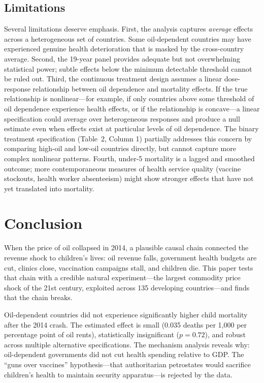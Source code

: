 \documentclass[12pt]{article}
\begin{document}
\subsection{Limitations}

Several limitations deserve emphasis. First, the analysis captures \textit{average} effects across a heterogeneous set of countries. Some oil-dependent countries may have experienced genuine health deterioration that is masked by the cross-country average. Second, the 19-year panel provides adequate but not overwhelming statistical power; subtle effects below the minimum detectable threshold cannot be ruled out. Third, the continuous treatment design assumes a linear dose-response relationship between oil dependence and mortality effects. If the true relationship is nonlinear---for example, if only countries above some threshold of oil dependence experience health effects, or if the relationship is concave---a linear specification could average over heterogeneous responses and produce a null estimate even when effects exist at particular levels of oil dependence. The binary treatment specification (Table~2, Column 1) partially addresses this concern by comparing high-oil and low-oil countries directly, but cannot capture more complex nonlinear patterns. Fourth, under-5 mortality is a lagged and smoothed outcome; more contemporaneous measures of health service quality (vaccine stockouts, health worker absenteeism) might show stronger effects that have not yet translated into mortality.


\section{Conclusion}
\label{sec:conclusion}

When the price of oil collapsed in 2014, a plausible causal chain connected the revenue shock to children's lives: oil revenue falls, government health budgets are cut, clinics close, vaccination campaigns stall, and children die. This paper tests that chain with a credible natural experiment---the largest commodity price shock of the 21st century, exploited across 135 developing countries---and finds that the chain breaks.

Oil-dependent countries did not experience significantly higher child mortality after the 2014 crash. The estimated effect is small (0.035 deaths per 1,000 per percentage point of oil rents), statistically insignificant ($p = 0.72$), and robust across multiple alternative specifications. The mechanism analysis reveals why: oil-dependent governments did not cut health spending relative to GDP. The ``guns over vaccines'' hypothesis---that authoritarian petrostates would sacrifice children's health to maintain security apparatus---is rejected by the data.
\end{document}

